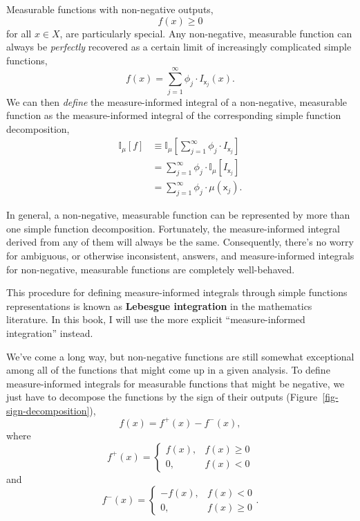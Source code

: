 \documentclass[
  letterpaper,
  DIV=11,
  numbers=noendperiod]{scrartcl}
\begin{document}
Measurable functions with non-negative outputs, \[
f(x) \ge 0
\] for all \(x \in X\), are particularly special. Any non-negative,
measurable function can always be \emph{perfectly} recovered as a
certain limit of increasingly complicated simple functions, \[
f(x)
=
\sum_{j = 1}^{\infty} \phi_{j} \cdot I_{\mathsf{x}_{j}}(x).
\] We can then \emph{define} the measure-informed integral of a
non-negative, measurable function as the measure-informed integral of
the corresponding simple function decomposition, \begin{align*}
\mathbb{I}_{\mu}[f]
&\equiv
\mathbb{I}_{\mu} \left[
\sum_{j = 1}^{\infty} \phi_{j} \cdot I_{\mathsf{x}_{j}} \right]
\\
&=
\sum_{j = 1}^{\infty} \phi_{j} \cdot
\mathbb{I}_{\mu} \left[I_{\mathsf{x}_{j}} \right]
\\
&=
\sum_{j = 1}^{\infty} \phi_{j} \cdot
\mu(\mathsf{x}_{j}).
\end{align*}

In general, a non-negative, measurable function can be represented by
more than one simple function decomposition. Fortunately, the
measure-informed integral derived from any of them will always be the
same. Consequently, there's no worry for ambiguous, or otherwise
inconsistent, answers, and measure-informed integrals for non-negative,
measurable functions are completely well-behaved.

This procedure for defining measure-informed integrals through simple
functions representations is known as \textbf{Lebesgue integration} in
the mathematics literature. In this book, I will use the more explicit
``measure-informed integration'' instead.

We've come a long way, but non-negative functions are still somewhat
exceptional among all of the functions that might come up in a given
analysis. To define measure-informed integrals for measurable functions
that might be negative, we just have to decompose the functions by the
sign of their outputs (Figure~\ref{fig-sign-decomposition}), \[
f(x) = f^{+}(x) - f^{-}(x),
\] where \[
f^{+} (x) =
\left\{
\begin{array}{rr}
f(x), & f(x) \ge 0 \\
0, & f(x) < 0
\end{array}
\right.
\] and \[
f^{-} (x) =
\left\{
\begin{array}{rr}
- f(x), & f(x) < 0 \\
0, & f(x) \ge 0
\end{array}
\right. .
\]
\end{document}
